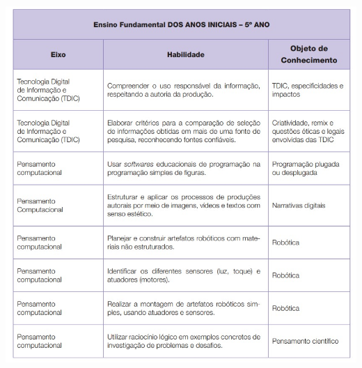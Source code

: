 \begin{center}
	\includegraphics[height=\textheight]{./IMG/ano-5.jpeg}
\end{center}

\pagebreak

%

\pagebreak

